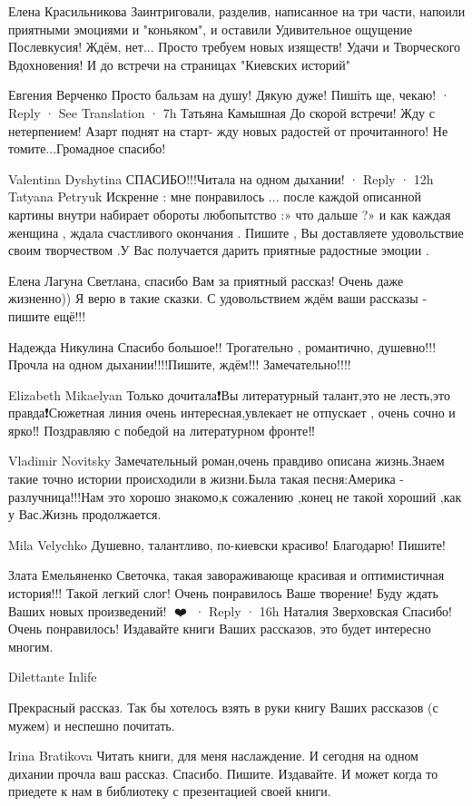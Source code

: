 Елена Красильникова
Заинтриговали, разделив, написанное на три части, напоили приятными эмоциями и "коньяком", и оставили Удивительное ощущение Послевкусия!
Ждём, нет... Просто требуем новых изяществ!
Удачи и Творческого Вдохновения! И до встречи на страницах "Киевских историй"

Евгения Верченко
Просто бальзам на душу! Дякую дуже! Пишіть ще, чекаю!
 · Reply · See Translation · 7h
Татьяна Камышная
До скорой встречи! Жду с нетерпением! Азарт поднят на старт- жду новых радостей от прочитанного! Не томите...Громадное спасибо!

Valentina Dyshytina
СПАСИБО!!!Читала на одном дыхании!
 · Reply · 12h
Tatyana Petryuk
Искренне : мне понравилось ... после каждой описанной картины внутри набирает обороты любопытство :» что дальше ?» и как каждая женщина , ждала счастливого окончания .
Пишите , Вы доставляете удовольствие своим творчеством .У Вас получается дарить приятные радостные эмоции .

Елена Лагуна
Светлана, спасибо Вам за приятный рассказ! Очень даже жизненно)) Я верю в такие сказки. С удовольствием ждём ваши рассказы - пишите ещё!!!

Надежда Никулина
Спасибо большое!! Трогательно , романтично, душевно!!!Прочла на одном дыхании!!!!Пишите, ждём!!! Замечательно!!!!

Elizabeth Mikaelyan
Только дочитала❗Вы литературный талант,это не лесть,это правда❗Сюжетная линия очень интересная,увлекает не отпускает ,
очень сочно и ярко‼️ Поздравляю с победой на литературном фронте‼️👏

Vladimir Novitsky
Замечательный роман,очень правдиво описана жизнь.Знаем такие точно истории происходили в жизни.Была такая песня:Америка - разлучница!!!Нам это хорошо знакомо,к сожалению ,конец не такой хороший ,как у Вас.Жизнь продолжается.

Mila Velychko
Душевно, талантливо, по-киевски красиво! Благодарю! Пишите!

Злата Емельяненко
Светочка, такая завораживающе красивая и оптимистичная история!!! Такой легкий слог! Очень понравилось Ваше творение! Буду ждать Ваших новых произведений! 👏❤️👏
 · Reply · 16h
Наталия Зверховская
Спасибо! Очень понравилось! Издавайте книги Ваших рассказов, это будет интересно многим.

Dilettante Inlife

Прекрасный рассказ. Так бы хотелось взять в руки книгу Ваших рассказов (с мужем) и неспешно почитать.

Irina Bratikova
Читать книги, для меня наслаждение. И сегодня на одном дихании прочла ваш рассказ. Спасибо. Пишите. Издавайте. И может когда то приедете к нам в библиотеку с презентацией своей книги.

